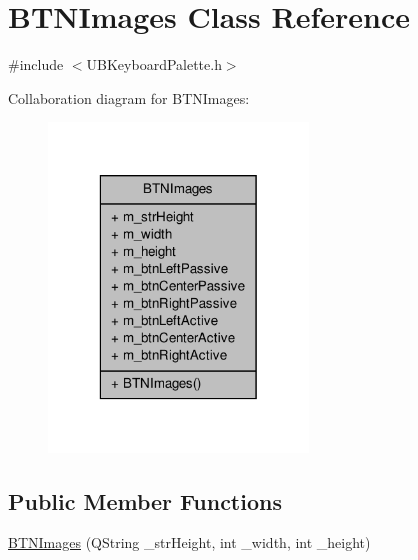 \hypertarget{class_b_t_n_images}{\section{B\-T\-N\-Images Class Reference}
\label{d2/d5c/class_b_t_n_images}
}


{\ttfamily \#include $<$U\-B\-Keyboard\-Palette.\-h$>$}



Collaboration diagram for B\-T\-N\-Images\-:
\nopagebreak
\begin{figure}[H]
\begin{center}
\leavevmode
\includegraphics[width=196pt]{d0/d47/class_b_t_n_images__coll__graph}
\end{center}
\end{figure}
\subsection*{Public Member Functions}
\begin{DoxyCompactItemize}
\item 
\hyperlink{class_b_t_n_images_acf36a0047870983fd02b62ad3de5006e}{B\-T\-N\-Images} (Q\-String \-\_\-str\-Height, int \-\_\-width, int \-\_\-height)
\end{DoxyCompactItemize}

